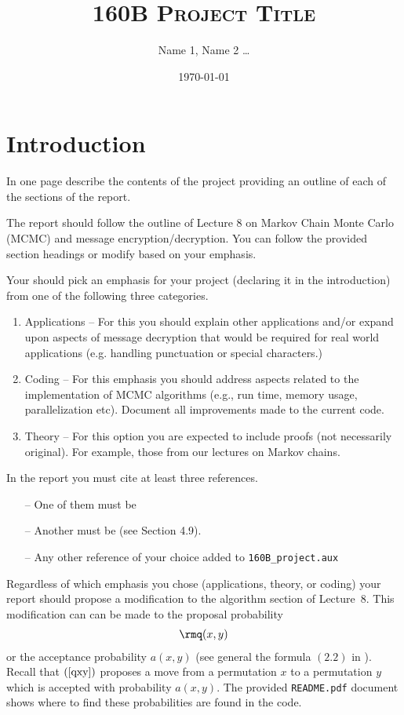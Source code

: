 \documentclass{article}
\title{\textsc{160B Project Title}}
\author{Name 1, \quad Name 2 \quad \dots }
\date{\today}
\newcommand{\req}[1]{(\ref{#1})}
\begin{document}
\maketitle
\tableofcontents

\section{Introduction}

In one page describe the contents of the project providing an
outline of each of the sections of the report.

The report should follow the outline of Lecture 8 on Markov
Chain Monte Carlo (MCMC) and message encryption/decryption. 
You can follow the provided section headings or modify based on
your emphasis.

Your should pick an emphasis for your project (declaring
it in the introduction) from one of the following
three categories.
\begin{enumerate}
\item Applications -- For this you should explain other
applications and/or expand upon aspects of message decryption
that would be required for real world applications (e.g. handling
punctuation or special characters.)
\item Coding -- For this emphasis you should address aspects
related to the implementation of MCMC algorithms (e.g., run time,
memory usage, parallelization etc). Document all improvements
made to the current code.
\item Theory -- For this option you are expected to include
proofs (not necessarily original). For example, those from
our lectures on Markov chains.
\end{enumerate}

In the report you must cite at least three references.
\begin{itemize}
\item[--] One of them must be \cite{connor2003}
\item[--] Another must be \cite{Ross2019} (see Section 4.9).
\item[--] Any other reference of your choice added
to \verb|160B_project.aux|
\end{itemize}


Regardless of which emphasis you chose (applications,
theory, or coding) your report should 
propose a modification to the algorithm section of Lecture~8.
This modification can can be made to the proposal
probability
\begin{align} \label{qxy} \rmq(x,y) 
\end{align}
or the acceptance probability $a(x,y)$ (see general the
formula $(2.2)$ in \cite{connor2003}).
Recall that $\req{qxy}$ proposes a move from a permutation
$x$ to a permutation $y$ which is accepted with
probability $a(x,y)$. The provided 
\verb|README.pdf| document shows where to find these 
probabilities are found in the code.
\end{document}
